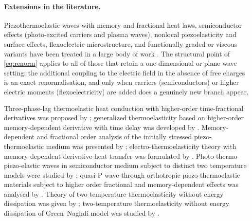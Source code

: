\paragraph{Extensions in the literature.} Piezothermoelastic waves with memory and fractional heat laws, semiconductor effects (photo-excited carriers and plasma waves), nonlocal piezoelasticity and surface effects, flexoelectric microstructure, and functionally graded or viscous variants have been treated in a large body of work \citep{Gupta2023,Gupta2024a,Gupta2026HeatMap,Das2026,Zang2014,Li2018,Liu2020,Singh2020c,Kumar2024,Kumar2024a,Abouelregal2023,Srivastava2026}. The structural point of \eqref{eq:renorm} applies to all of those that retain a one-dimensional or plane-wave setting: the additional coupling to the electric field in the absence of free charges is an exact renormalisation, and only when carriers (semiconductors) or higher electric moments (flexoelectricity) are added does a genuinely new branch appear.

Three-phase-lag thermoelastic heat conduction with higher-order time-fractional derivatives was proposed by \citep{Abouelregal2019}; generalized thermoelasticity based on higher-order memory-dependent derivative with time delay was developed by \citep{Abouelregal2021}. Memory-dependent and fractional order analysis of the initially stressed piezo-thermoelastic medium was presented by \citep{Barak2023a}; electro-thermoelasticity theory with memory-dependent derivative heat transfer was formulated by \citep{Ezzat2016a}. Photo-thermo-piezo-elastic waves in semiconductor medium subject to distinct two temperature models were studied by \citep{Gupta2023a}; quasi-P wave through orthotropic piezo-thermoelastic materials subject to higher order fractional and memory-dependent effects was analysed by \citep{Gupta2023b}. Theory of two-temperature thermoelasticity without energy dissipation was given by \citep{Youssef2011}; two-temperature thermoelasticity without energy dissipation of Green--Naghdi model was studied by \citep{Youssef2014}.

